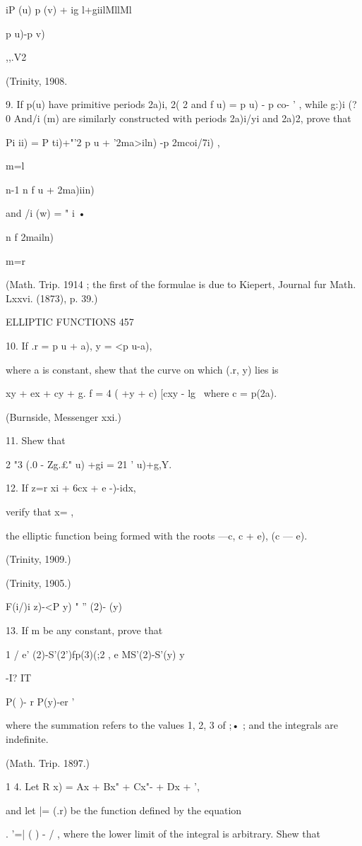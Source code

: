 {iP (u) p (v) + ig l+giilMllMl

 p u)-p v)

,,.V2

(Trinity, 1908.

9. If p(u) have primitive periods 2a)i, 2( 2 and f u) = p u) - p co- '
, while g:)i (?0 And/i (m) are similarly constructed with periods
2a)i/yi and 2a)2, prove that

Pi ii) = P ti)+"'2 p u + '2ma>iln) -p 2mcoi/7i) ,

m=l

n-1 n f u + 2ma)iin)

 and /i (w) = " i •

n f 2mailn)

m=r

(Math. Trip. 1914 ; the first of the formulae is due to Kiepert,
Journal fur Math. Lxxvi. (1873), p. 39.)

ELLIPTIC FUNCTIONS 457

10. If .r = p u + a), y = <p u-a),

where a is constant, shew that the curve on which (.r, y) lies is

 xy + ex + cy + g. f = 4 ( +y + c) [cxy - lg \ where c = p(2a).

(Burnside, Messenger xxi.)

11. Shew that

2 "3 (.0 - Zg.£" u) +gi = 21 ' u)+g,Y.

12. If z=r xi + 6cx + e -)-idx,

verify that x= ,

the elliptic function being formed with the roots —c, c + e), (c — e).

(Trinity, 1909.)

(Trinity, 1905.)

F(i/)i z)-<P y) " '' (2)- (y)

13. If m be any constant, prove that

1 / e' (2)-S'(2')fp(3)(;2 , e MS'(2)-S'(y) y

-I? IT

 P( )- r P(y)-er '

where the summation refers to the values 1, 2, 3 of ;• ; and the
integrals are indefinite.

(Math. Trip. 1897.)

1 4. Let R x) = Ax + Bx" + Cx"- + Dx + ',

and let |= (.r) be the function defined by the equation

. '=| ( ) - / , where the lower limit of the integral is arbitrary.
Shew that

}
